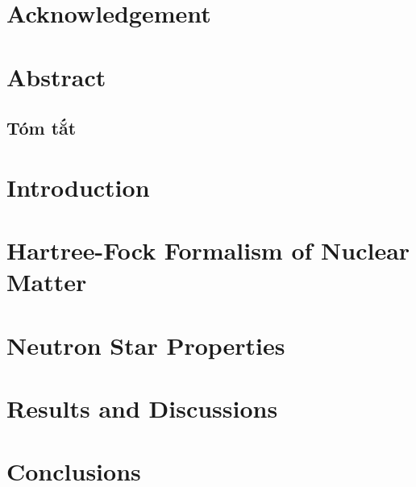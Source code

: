 \documentclass[a4paper,12pt]{report}
\theoremstyle{plain}\newtheorem{ques}{Question}
\theoremstyle{definition}\newtheorem*{ans}{Answer}
\begin{document}
        \restoregeometry
        \tableofcontents
        \setcounter{page}{1}

        \chapter*{Acknowledgement}
        \label{chap:acknowledgement}
        

        \printglossary[title={List of Abbreviations}]
        \listoftables
        \listoffigures

        \captionsetup{width=0.9\linewidth}

        \chapter*{Abstract}
        \label{chap:abstract}
        

        \begin{otherlanguage}{vietnamese}
        \chapter*{Tóm tắt}
        \label{chap:abstract_vn}
        
        \end{otherlanguage}

        \chapter{Introduction}
        \setcounter{page}{1}
        \label{chap:intro}
        

        \chapter{Hartree-Fock Formalism of Nuclear Matter}
        \label{chap:hf}
        

        \chapter{Neutron Star Properties}
        \label{chap:ns_prop}
        

        \chapter{Results and Discussions}
        \label{chap:result}
        
        
        \chapter{Conclusions}
        \label{chap:conclusion}
        

        \clearpage
        
        
\end{document}
